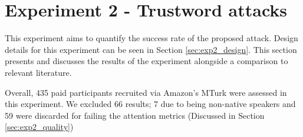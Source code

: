 
\section{Experiment 2 - Trustword attacks}

\begin{table*}[t]
    \caption{Success rates for simulated attacks}
    \label{tab:exp2_attacks}
\end{table*}

\label{sec:exp2}
This experiment aims to quantify the success rate of the proposed attack. Design details for this experiment can be seen in Section \ref{sec:exp2_design}. This section presents and discusses the results of the experiment alongside a comparison to relevant literature.

Overall, 435 paid participants recruited via Amazon's MTurk were assessed in this experiment. We excluded 66 results; 7 due to being non-native speakers and 59 were discarded for failing the attention metrics (Discussed in Section \ref{sec:exp2_quality})

